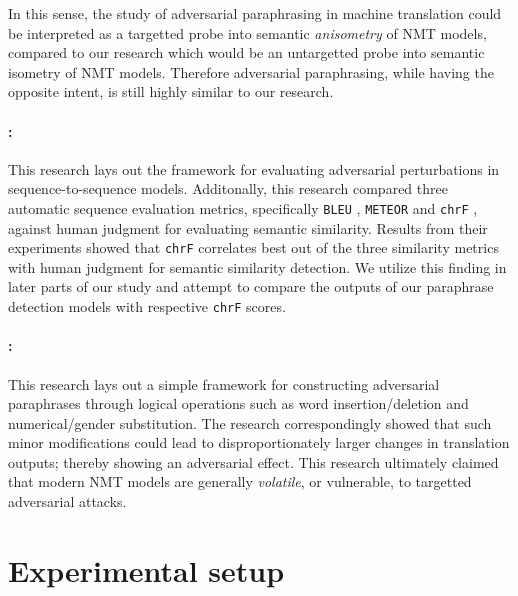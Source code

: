 \documentclass[11pt,a4paper]{article}
\begin{document}
In this sense, the study of adversarial paraphrasing in machine translation could be interpreted as a targetted probe into semantic \textit{anisometry} of NMT models, compared to our research which would be an untargetted probe into semantic isometry of NMT models. Therefore adversarial paraphrasing, while having the opposite intent, is still highly similar to our research.

\paragraph{\citet{michel2019evaluation}:} This research lays out the framework for evaluating adversarial perturbations in sequence-to-sequence models. Additonally, this research compared three automatic sequence evaluation metrics, specifically \texttt{BLEU} \cite{papineni2002bleu}, \texttt{METEOR} \cite{denkowski2014meteor} and \texttt{chrF} \cite{popovic2015chrf}, against human judgment for evaluating semantic similarity. Results from their experiments showed that \texttt{chrF} correlates best out of the three similarity metrics with human judgment for semantic similarity detection. We utilize this finding in later parts of our study and attempt to compare the outputs of our paraphrase detection models with respective \texttt{chrF} scores.

\paragraph{\citet{fadaee2020unreasonable}:} This research lays out a simple framework for constructing adversarial paraphrases through logical operations such as word insertion/deletion and numerical/gender substitution. The research correspondingly showed that such minor modifications could lead to disproportionately larger changes in translation outputs; thereby showing an adversarial effect. This research ultimately claimed that modern NMT models are generally \textit{volatile}, or vulnerable, to targetted adversarial attacks. 


\section{Experimental setup}
\end{document}

